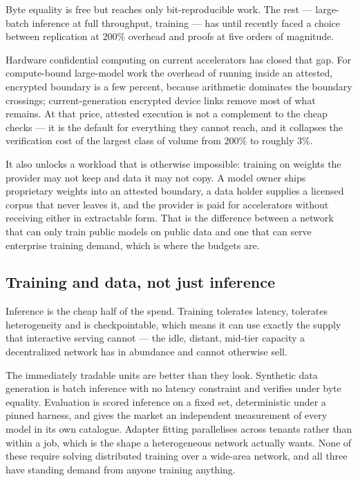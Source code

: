 \documentclass[11pt,a4paper]{article}
\begin{document}
Byte equality is free but reaches only bit-reproducible work. The rest ---
large-batch inference at full throughput, training --- has until recently faced a
choice between replication at $200\%$ overhead and proofs at five orders of
magnitude.

Hardware confidential computing on current accelerators has closed that gap. For
compute-bound large-model work the overhead of running inside an attested,
encrypted boundary is a few percent, because arithmetic dominates the boundary
crossings; current-generation encrypted device links remove most of what remains.
At that price, attested execution is not a complement to the cheap checks --- it
is the default for everything they cannot reach, and it collapses the
verification cost of the largest class of volume from $200\%$ to roughly $3\%$.

It also unlocks a workload that is otherwise impossible: training on weights the
provider may not keep and data it may not copy. A model owner ships proprietary
weights into an attested boundary, a data holder supplies a licensed corpus that
never leaves it, and the provider is paid for accelerators without receiving
either in extractable form. That is the difference between a network that can only
train public models on public data and one that can serve enterprise training
demand, which is where the budgets are.

\subsection{Training and data, not just inference}

Inference is the cheap half of the spend. Training tolerates latency, tolerates
heterogeneity and is checkpointable, which means it can use exactly the supply
that interactive serving cannot --- the idle, distant, mid-tier capacity a
decentralized network has in abundance and cannot otherwise sell.

The immediately tradable units are better than they look. Synthetic data
generation is batch inference with no latency constraint and verifies under byte
equality. Evaluation is scored inference on a fixed set, deterministic under a
pinned harness, and gives the market an independent measurement of every model in
its own catalogue. Adapter fitting parallelises across tenants rather than within a
job, which is the shape a heterogeneous network actually wants. None of these
require solving distributed training over a wide-area network, and all three have
standing demand from anyone training anything.
\end{document}
